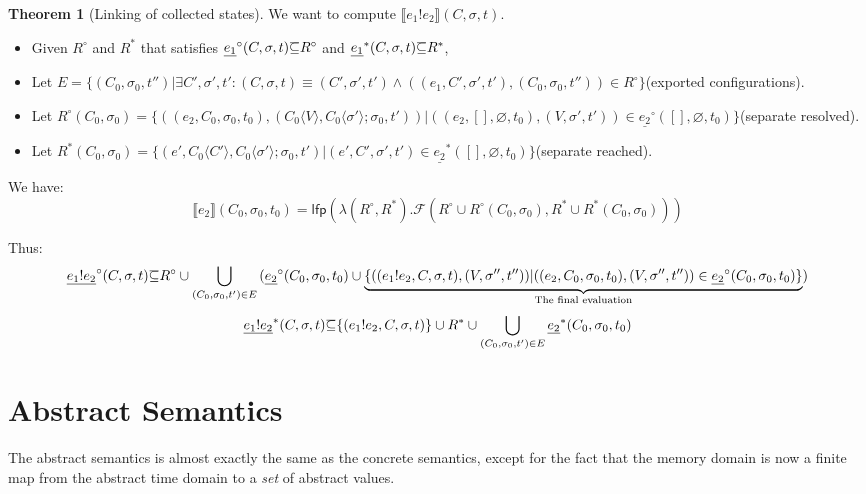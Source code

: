 \documentclass{article}
\theoremstyle{definition}
\newtheorem{thm}{Theorem}[section]
\def\ovbarw{1.2mu}
\def\ovbarh{0.8}
\newcommand*{\ovbar}[1]{\mkern \ovbarw\overline{\mkern-\ovbarw{\smash{#1}\scalebox{1}[\ovbarh]{\vphantom{i}}}\mkern-\ovbarw}\mkern \ovbarw}
\newcommand*{\link}[2]{{#1}\mathtt{!}{#2}}
\newcommand*{\Reach}[1]{\underline{#1}^{*}}
\newcommand*{\Resolved}[1]{\underline{#1}^{\circ}}
\newcommand*{\sembracket}[1]{\lBrack{#1}\rBrack}
\newcommand*{\inject}[2]{{#1}\langle{#2}\rangle}
\begin{document}
\begin{thm}[Linking of collected states] We want to compute $\sembracket{\link{e_{1}}{e_{2}}}(C,\sigma,t)$.
  $\:$

  \begin{itemize}
    \item Given $R^{\circ}$ and $R^{*}$ that satisfies $\Resolved{e_{1}}(C,\sigma,t)\ovbar{\subseteq} R^{\circ}$ and $\Reach{e_{1}}(C,\sigma,t)\ovbar{\subseteq} R^{*}$,
    \item Let $E=\{(C_{0},\sigma_{0},t'')|\exists C',\sigma',t':(C,\sigma,t)\equiv(C',\sigma',t')\wedge((e_{1},C',\sigma',t'),(C_{0},\sigma_{0},t''))\in R^{\circ}\}$(exported configurations).
    \item Let $R^{\circ}(C_{0},\sigma_{0})=\{((e_{2},C_{0},\sigma_{0},t_{0}), (\inject{C_{0}}{V},\inject{C_{0}}{\sigma'};\sigma_{0},t'))|((e_{2},[],\varnothing,t_{0}),(V,\sigma',t'))\in\Resolved{e_{2}}([],\varnothing,t_{0})\}$(separate resolved).
    \item Let $R^{*}(C_{0},\sigma_{0})=\{(e',\inject{C_{0}}{C'},\inject{C_{0}}{\sigma'};\sigma_{0},t')|(e',C',\sigma',t')\in\Reach{e_{2}}([],\varnothing,t_{0})\}$(separate reached).
  \end{itemize}

  We have:
  \[
    \sembracket{e_{2}}(C_{0},\sigma_{0},t_{0})=\mathsf{lfp}(\lambda (R^{\circ}, R^{*}).\mathcal{F}(R^{\circ}\cup R^{\circ}(C_{0},\sigma_{0}), R^{*}\cup R^{*}(C_{0},\sigma_{0})))
  \]

  Thus:
  \[
    \Resolved{\link{e_1}{e_2}}(C,\sigma,t)\ovbar{\subseteq}
    R^{\circ}\cup\bigcup_{(C_{0},\sigma_{0},t')\in E}{(\Resolved{e_2}(C_{0},\sigma_{0},t_{0})\cup\underbrace{\{((\link{e_1}{e_2}, C, \sigma, t), (V,\sigma'',t''))|((e_{2},C_{0},\sigma_{0},t_{0}),(V,\sigma'',t''))\in\Resolved{e_{2}}(C_{0},\sigma_{0},t_{0})\}}_{\text{The final evaluation}})}
  \]
  \begin{align*}
    \Reach{\link{e_1}{e_2}}(C,\sigma,t)\ovbar{\subseteq}\{(\link{e_1}{e_2},C,\sigma,t)\}\cup R^{*}\cup\bigcup_{(C_{0},\sigma_{0},t')\in E}{\Reach{e_2}(C_{0},\sigma_{0},t_{0})}
  \end{align*}
\end{thm}

\section{Abstract Semantics}

The abstract semantics is almost exactly the same as the concrete semantics, except for the fact that the memory domain is now a finite map from the abstract time domain to a \emph{set} of abstract values.
\end{document}

